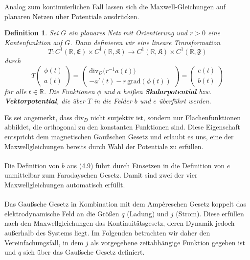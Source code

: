 \documentclass[11pt,a4paper,leqno]{report}
\newtheorem{definition}[theorem]{Definition}
\numberwithin{equation}{chapter}
\begin{document}
Analog zum kontinuierlichen Fall lassen sich die Maxwell-Gleichungen auf planaren Netzen über Potentiale ausdrücken.  
\begin{definition} \label{def:potential_def}
	Sei \(G\) ein planares Netz mit Orientierung und \(r > 0\) eine Kantenfunktion auf \(G\).  
	Dann definieren wir eine lineare Transformation 
	\[
	T : C^1(\mathbb{R}, \mathfrak{E}) \times C^1(\mathbb{R}, \mathfrak{K}) \to C^1(\mathbb{R}, \mathfrak{K}) \times C^1(\mathbb{R}, \mathfrak{F})
	\]
	durch
	\begin{equation}
		T \begin{pmatrix} \phi(t) \\ a(t) \end{pmatrix}
		= \begin{pmatrix}
			\mathrm{div}_D \bigl(r^{-1} a(t)\bigr) \\
			- a'(t) - r\, \mathrm{grad}(\phi(t))
		\end{pmatrix}= \begin{pmatrix} e(t) \\ b(t) \end{pmatrix}
	\end{equation}
	für alle \(t \in \mathbb{R}\). Die Funktionen \(\phi\) und \(a\) heißen \textbf{Skalarpotential} bzw. \textbf{Vektorpotential}, die über \(T\) in die Felder \(b\) und \(e\) überführt werden.
\end{definition}
\noindent
Es sei angemerkt, dass \(\mathrm{div}_D\) nicht surjektiv ist, sondern nur Flächenfunktionen abbildet, die orthogonal zu den konstanten Funktionen sind. Diese Eigenschaft entspricht dem magnetischen Gaußschen Gesetz und erlaubt es uns, eine der Maxwellgleichungen bereits durch Wahl der Potentiale zu erfüllen.  \\
\\
Die Definition von \(b\) aus (4.9) führt durch Einsetzen in die Definition von \(e\) unmittelbar zum Faradayschen Gesetz. Damit sind zwei der vier Maxwellgleichungen automatisch erfüllt.  
\\
\\
Das Gaußsche Gesetz in Kombination mit dem Ampèreschen Gesetz koppelt das elektrodynamische Feld an die Größen \(q\) (Ladung) und \(j\) (Strom). Diese erfüllen nach den Maxwellgleichungen das Kontinuitätsgesetz, deren Dynamik jedoch außerhalb des Systems liegt. Im Folgenden betrachten wir daher den Vereinfachungsfall, in dem \(j\) als vorgegebene zeitabhängige Funktion gegeben ist und \(q\) sich über das Gaußsche Gesetz definiert.  \\
\end{document}
